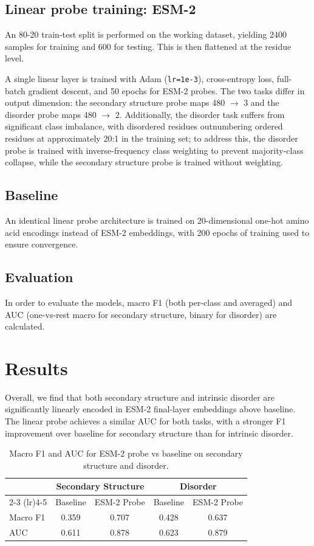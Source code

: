 \documentclass[12pt, letterpaper]{article}
\begin{document}
\subsection{Linear probe training: ESM-2}
An 80-20 train-test split is performed on the working dataset, yielding 2400 samples for training and 600 for testing. This is then flattened at the residue level. 

A single linear layer is trained with Adam (\texttt{lr=1e-3}), cross-entropy loss, full-batch gradient descent, and 50 epochs for ESM-2 probes. The two tasks differ in output dimension: the secondary structure probe maps 480 $\rightarrow$ 3 and the disorder probe maps 480 $\rightarrow$ 2. Additionally, the disorder task suffers from significant class imbalance, with disordered residues outnumbering ordered residues at approximately 20:1 in the training set; to address this, the disorder probe is trained with inverse-frequency class weighting to prevent majority-class collapse, while the secondary structure probe is trained without weighting. 

\subsection{Baseline}
An identical linear probe architecture is trained on 20-dimensional one-hot amino acid encodings instead of ESM-2 embeddings, with 200 epochs of training used to ensure convergence.

\subsection{Evaluation}
In order to evaluate the models, macro F1 (both per-class and averaged) and AUC (one-vs-rest macro for secondary structure, binary for disorder) are calculated. 

\section{Results}
Overall, we find that both secondary structure and intrinsic disorder are significantly linearly encoded in ESM-2 final-layer embeddings above baseline. The linear probe achieves a similar AUC for both tasks, with a stronger F1 improvement over baseline for secondary structure than for intrinsic disorder.

\begin{table}[h]
\centering
\begin{tabular}{lcccc}
\toprule
 & \multicolumn{2}{c}{Secondary Structure} & \multicolumn{2}{c}{Disorder} \\
\cmidrule(lr){2-3} \cmidrule(lr){4-5}
 & Baseline & ESM-2 Probe & Baseline & ESM-2 Probe \\
\midrule
Macro F1 & 0.359 & 0.707 & 0.428 & 0.637 \\
AUC      & 0.611 & 0.878 & 0.623 & 0.879 \\
\bottomrule
\end{tabular}
\caption{Macro F1 and AUC for ESM-2 probe vs baseline on secondary structure and disorder.}
\label{tab:summary}
\end{table}
\end{document}
